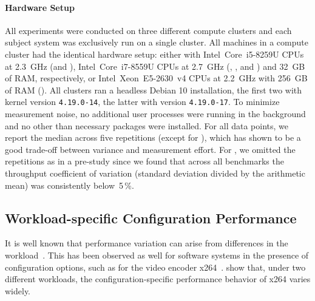 \paragraph*{Hardware Setup}
All experiments were conducted on three different compute clusters and each subject system was exclusively run on a single cluster. All machines in a compute cluster had the identical hardware setup: either with Intel~Core~i5-8259U CPUs at 2.3~GHz (\jumper and \kanzi),  Intel~Core~i7-8559U CPUs at 2.7~GHz (\dconvert, \batik, and \jadx) and 32~GB of RAM, respectively, or Intel~Xeon~E5-2630~v4 CPUs at 2.2~GHz with 256~GB of RAM (\htwo). All clusters ran a headless Debian 10 installation, the first two with kernel version \mbox{\texttt{4.19.0-14}}, the latter with version \mbox{\texttt{4.19.0-17}}. 
To minimize measurement noise, no additional user processes were running in the background and no other than necessary packages were installed.
	For all data points, we report the median across five repetitions (except for \htwo), which has shown to be a good trade-off between variance and measurement effort. For \htwo, we omitted the repetitions as in a pre-study since we found that across all benchmarks the throughput coefficient of variation (standard deviation divided by the arithmetic mean) was consistently below~5\,\%. 


\subsection{Workload-specific Configuration Performance}\label{sec:rq1}
It is well known that performance variation can arise from differences in the workload~\cite{benchmarking_book}. 
This has been observed as well for software systems in the presence of configuration options, such as for the video encoder x264~\cite{alves_sampling_2020}. \citeauthor{alves_sampling_2020} show that, under two different workloads, the configuration-specific performance behavior of x264 varies widely. 


